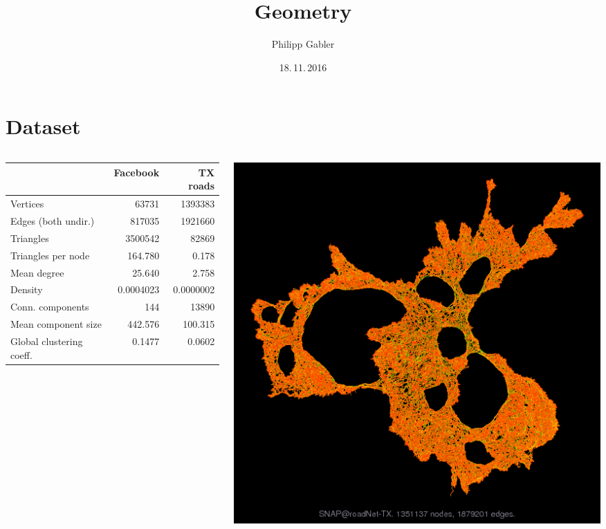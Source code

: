 \documentclass{beamer}
\author{Philipp Gabler}
\title{Geometry}
\date{18.\,11.\,2016}
\begin{document}
\beamertemplatenavigationsymbolsempty

\section{Dataset}
\begin{frame}
  \begin{columns}
    \begin{column}{0.7\textwidth}
      \small
      \begin{tabular}{lrr}
        \toprule
        & Facebook\footnotemark & TX roads\footnotemark \\
        \midrule
        Vertices & 63731 & 1393383 \\
        Edges (both undir.) & 817035 & 1921660 \\
        Triangles & 3500542 & 82869 \\
        Triangles per node & 164.780 & 0.178 \\
        Mean degree & 25.640 & 2.758 \\
        Density & 0.0004023 & 0.0000002 \\
        Conn. components & 144 & 13890 \\
        Mean component size & 442.576 & 100.315 \\
        Global clustering coeff. & 0.1477 & 0.0602 \\
        \bottomrule
      \end{tabular}
    \end{column}
    \begin{column}{0.3\textwidth}
      \includegraphics[width=\textwidth]{fig/texas-image}
    \end{column}
  \end{columns}


\end{frame}
\end{document}

